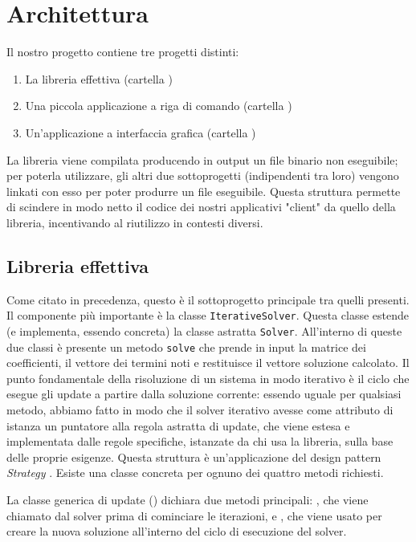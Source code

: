 \section{Architettura}

Il nostro progetto contiene tre progetti distinti:

\begin{enumerate}
	\item La libreria effettiva (cartella )
	\item Una piccola applicazione a riga di comando (cartella )
	\item Un'applicazione a interfaccia grafica (cartella )
\end{enumerate}

La libreria viene compilata producendo in output un file binario non eseguibile; per poterla utilizzare, gli altri due sottoprogetti (indipendenti tra loro) vengono linkati con esso per poter produrre un file eseguibile. Questa struttura permette di scindere in modo netto il codice dei nostri applicativi "client" da quello della libreria, incentivando al riutilizzo in contesti diversi.

\subsection{Libreria effettiva}
Come citato in precedenza, questo è il sottoprogetto principale tra quelli presenti. Il componente più importante è la classe \texttt{IterativeSolver}. Questa classe estende (e implementa, essendo concreta) la classe astratta \texttt{Solver}. All'interno di queste due classi  è presente un metodo \texttt{solve} che prende in input la matrice dei coefficienti, il vettore dei termini noti e restituisce il vettore soluzione calcolato. Il punto fondamentale della risoluzione di un sistema in modo iterativo è il ciclo che esegue gli update a partire dalla soluzione corrente: essendo uguale per qualsiasi metodo, abbiamo fatto in modo che il solver iterativo avesse come attributo di istanza un puntatore alla regola astratta di update, che viene estesa e implementata dalle regole specifiche, istanzate da chi usa la libreria, sulla base delle proprie esigenze. Questa struttura è un'applicazione del design pattern \textit{Strategy} \cite{Strategy}. Esiste una classe concreta per ognuno dei quattro metodi richiesti.

La classe generica di update () dichiara due metodi principali: , che viene chiamato dal solver prima di cominciare le iterazioni, e , che viene usato per creare la nuova soluzione all'interno del ciclo di esecuzione del solver.

